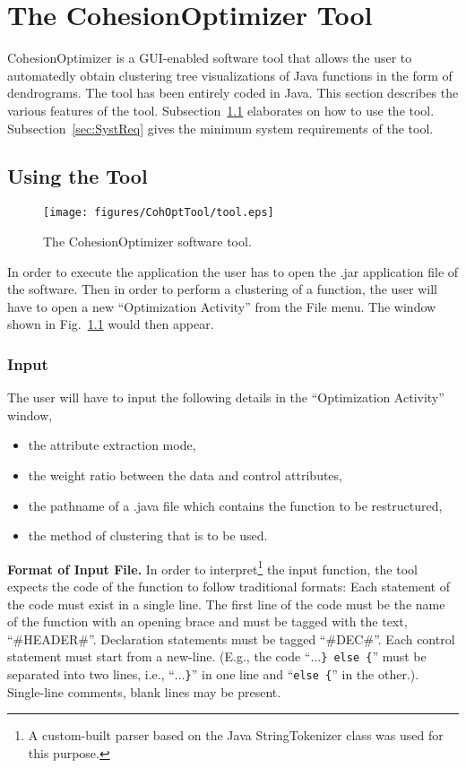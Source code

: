 \chapter{The CohesionOptimizer Tool}
\label{chap:cohOpt}
CohesionOptimizer is a GUI-enabled software tool that allows the user to automatedly obtain clustering tree visualizations of Java functions in the form of dendrograms. The tool has been entirely coded in Java. This section describes the various features of the tool. Subsection~\ref{sec:toolUse} elaborates on how to use the tool. Subsection~\ref{sec:SystReq} gives the minimum system requirements of the tool. 

\section{Using the Tool}
\label{sec:toolUse}

\begin{figure}[!htbp]
\centering
\texttt{[image: figures/CohOptTool/tool.eps]}
\caption{The CohesionOptimizer software tool.}
\label{fig:CohOptTool}
\end{figure}

In order to execute the application the user has to open the .jar application file of the software. Then in order to perform a clustering of a function, the user will have to open a new ``Optimization Activity'' from the File menu. The window shown in Fig.~\ref{fig:CohOptTool} would then appear. 

\subsection{Input}
The user will have to input the following details in the ``Optimization Activity'' window,

\begin{itemize}
\item the attribute extraction mode,

\item the weight ratio between the data and control attributes,

\item the pathname of a .java file which contains the function to be restructured,

\item  the method of clustering that is to be used.

\end{itemize}

\textbf{Format of Input File.} In order to interpret\footnote{A custom-built parser based on the Java StringTokenizer class was used for this purpose.} the input function, the tool expects the code of the function to follow traditional formats: Each statement of the code must exist in a single line. The first line of the code must be the name of the function with an opening brace and must be tagged with the text, ``\#HEADER\#''. Declaration statements must be tagged ``\#DEC\#''. Each control statement must start from a new-line. (E.g., the code ``\texttt{$\ldots$\} else \{}'' must be separated into two lines, i.e., ``\texttt{$\ldots$\}}'' in one line and ``\texttt{else \{}'' in the other.). Single-line comments, blank lines may be present. 

